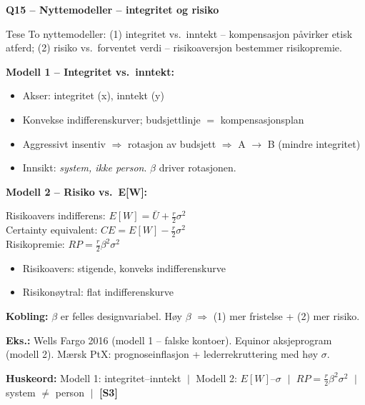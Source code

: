 \documentclass[10pt, a4paper]{article}
\newcommand{\SThree}{\textcolor{s3color}{\textbf{[S3]}}}
\newcommand{\qhead}[2]{%
  \noindent
  \begin{tcolorbox}[colback=boxborder, colframe=boxborder, arc=2pt, left=6pt, right=6pt, top=2pt, bottom=2pt]
    \color{white}\textbf{\large Q#1 -- #2}
  \end{tcolorbox}
}
\newcommand{\huskeord}[1]{%
  \vspace{2pt}
  \begin{tcolorbox}[colback=yellow!15, colframe=orange!70!black, boxrule=0.4pt, arc=2pt, left=4pt, right=4pt, top=2pt, bottom=2pt]
    \footnotesize\textbf{Huskeord:} #1
  \end{tcolorbox}
}
\begin{document}
\vfill\newpage

\qhead{15}{Nyttemodeller -- integritet og risiko}

\begin{keybox}{Tese}
To nyttemodeller: (1) integritet vs.\ inntekt -- kompensasjon påvirker etisk atferd; (2) risiko vs.\ forventet verdi -- risikoaversjon bestemmer risikopremie.
\end{keybox}

\textbf{Modell 1 -- Integritet vs.\ inntekt:}
\begin{itemize}
  \item Akser: integritet (x), inntekt (y)
  \item Konvekse indifferenskurver; budsjettlinje $=$ kompensasjonsplan
  \item Aggressivt insentiv $\Rightarrow$ rotasjon av budsjett $\Rightarrow$ A $\to$ B (mindre integritet)
  \item Innsikt: \emph{system, ikke person}. $\beta$ driver rotasjonen.
\end{itemize}

\textbf{Modell 2 -- Risiko vs.\ E[W]:}
\begin{formulabox}
Risikoavers indifferens: $E[W] = \bar{U} + \tfrac{r}{2}\sigma^{2}$ \\
Certainty equivalent: $CE = E[W] - \tfrac{r}{2}\sigma^{2}$ \\
Risikopremie: $RP = \tfrac{r}{2}\beta^{2}\sigma^{2}$
\end{formulabox}

\begin{itemize}
  \item Risikoavers: stigende, konveks indifferenskurve
  \item Risikonøytral: flat indifferenskurve
\end{itemize}

\textbf{Kobling:} $\beta$ er felles designvariabel. Høy $\beta$ $\Rightarrow$ (1) mer fristelse + (2) mer risiko.

\textbf{Eks.:} Wells Fargo 2016 (modell 1 -- falske kontoer). Equinor aksjeprogram (modell 2). Mærsk PtX: prognoseinflasjon + lederrekruttering med høy $\sigma$.

\huskeord{Modell 1: integritet--inntekt $\;\big|\;$ Modell 2: $E[W]$--$\sigma$ $\;\big|\;$ $RP = \tfrac{r}{2}\beta^{2}\sigma^{2}$ $\;\big|\;$ system $\neq$ person $\;\big|\;$ \SThree}
\end{document}
